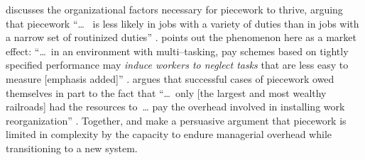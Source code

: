 \documentclass[trackingWork]{subfiles}
\begin{document}
\citeauthor{Brown01041990} discusses the organizational factors necessary for piecework to thrive,
arguing that piecework
``\dots~ is less likely in jobs with
a variety of duties than in jobs with a narrow set of routinized duties''
\cite{Brown01041990}.
\citeauthor{SJOE:SJOE371} points out the phenomenon here as a market effect:
``\dots~in an environment with multi--tasking,
pay schemes based on tightly specified performance may \textit{induce workers
to neglect tasks} that are less easy to measure [emphasis added]''
\cite{SJOE:SJOE371}.
\citeauthor{10.2307/23702539} argues that
successful cases of piecework owed themselves in part to the fact that
    ``\dots~only [the largest and most wealthy railroads] had the resources to~\dots
    pay the overhead involved in installing work reorganization''
\cite{10.2307/23702539}.
Together, \citeauthor{10.2307/23702539} and \citeauthor{Brown01041990}
make a persuasive argument that piecework is limited in complexity by
the capacity to endure managerial overhead while transitioning to a new system.
\end{document}
